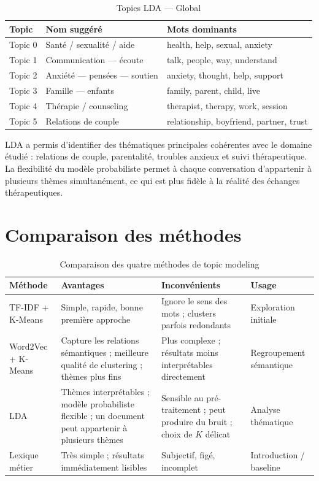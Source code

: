 \documentclass[12pt,a4paper]{article}
\begin{document}
\begin{table}[h]
\centering
\begin{tabularx}{\textwidth}{lXX}
\toprule
\textbf{Topic} & \textbf{Nom suggéré} & \textbf{Mots dominants} \\
\midrule
Topic 0 & Santé / sexualité / aide & health, help, sexual, anxiety \\
Topic 1 & Communication — écoute & talk, people, way, understand \\
Topic 2 & Anxiété — pensées — soutien & anxiety, thought, help, support \\
Topic 3 & Famille — enfants & family, parent, child, live \\
Topic 4 & Thérapie / counseling & therapist, therapy, work, session \\
Topic 5 & Relations de couple & relationship, boyfriend, partner, trust \\
\bottomrule
\end{tabularx}
\caption{Topics LDA — Global}
\end{table}

LDA a permis d'identifier des thématiques principales cohérentes avec le domaine étudié :
relations de couple, parentalité, troubles anxieux et suivi thérapeutique. La flexibilité du
modèle probabiliste permet à chaque conversation d'appartenir à plusieurs thèmes simultanément,
ce qui est plus fidèle à la réalité des échanges thérapeutiques.

\clearpage
\section{Comparaison des méthodes}

\begin{table}[h]
\centering
\begin{tabularx}{\textwidth}{lXXX}
\toprule
\textbf{Méthode} & \textbf{Avantages} & \textbf{Inconvénients} & \textbf{Usage} \\
\midrule
TF-IDF + K-Means
  & Simple, rapide, bonne première approche
  & Ignore le sens des mots ; clusters parfois redondants
  & Exploration initiale \\
\midrule
Word2Vec + K-Means
  & Capture les relations sémantiques ; meilleure qualité de clustering ; thèmes plus fins
  & Plus complexe ; résultats moins interprétables directement
  & Regroupement sémantique \\
\midrule
LDA
  & Thèmes interprétables ; modèle probabiliste flexible ; un document peut appartenir à plusieurs thèmes
  & Sensible au pré-traitement ; peut produire du bruit ; choix de $K$ délicat
  & Analyse thématique \\
\midrule
Lexique métier
  & Très simple ; résultats immédiatement lisibles
  & Subjectif, figé, incomplet
  & Introduction / baseline \\
\bottomrule
\end{tabularx}
\caption{Comparaison des quatre méthodes de topic modeling}
\end{table}
\end{document}
